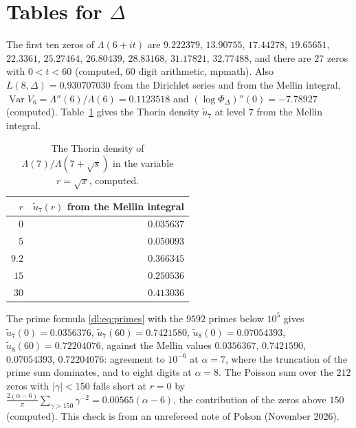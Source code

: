 \section{Tables for \texorpdfstring{$\Delta$}{Delta}}\label{dl:sec:tables}

The first ten zeros of $\Lambda(6+it)$ are $9.222379$, $13.90755$, $17.44278$, $19.65651$, $22.3361$, $25.27464$, $26.80439$, $28.83168$, $31.17821$, $32.77488$, and there are $27$ zeros with $0<t<60$ (computed, $60$ digit arithmetic, mpmath). Also $L(8,\Delta)=0.930707030$ from the Dirichlet series and from the Mellin integral, $\operatorname{Var}V_6=\Lambda''(6)/\Lambda(6)=0.1123518$ and $(\log\Phi_\Delta)''(0)=-7.78927$ (computed). Table~\ref{dl:tab:three} gives the Thorin density $\tilde u_7$ at level $7$ from the Mellin integral.

\begin{table}[htbp]
\centering\small
\begin{tabular}{rr}
\toprule
$r$ & $\tilde u_7(r)$ from the Mellin integral\\
\midrule
$0$ & $0.035637$\\
$5$ & $0.050093$\\
$9.2$ & $0.366345$\\
$15$ & $0.250536$\\
$30$ & $0.413036$\\
\bottomrule
\end{tabular}
\caption{The Thorin density of $\Lambda(7)/\Lambda(7+\sqrt s)$ in the variable $r=\sqrt x$, computed.}\label{dl:tab:three}
\end{table}

The prime formula \eqref{dl:eq:primes} with the $9592$ primes below $10^5$ gives $\tilde u_7(0)=0.0356376$, $\tilde u_7(60)=0.7421580$, $\tilde u_8(0)=0.07054393$, $\tilde u_8(60)=0.72204076$, against the Mellin values $0.0356367$, $0.7421590$, $0.07054393$, $0.72204076$: agreement to $10^{-6}$ at $\alpha=7$, where the truncation of the prime sum dominates, and to eight digits at $\alpha=8$. The Poisson sum over the $212$ zeros with $|\gamma|<150$ falls short at $r=0$ by $\frac{2(\alpha-6)}\pi\sum_{\gamma>150}\gamma^{-2}=0.00565(\alpha-6)$, the contribution of the zeros above $150$ (computed). This check is from an unrefereed note of Polson (November 2026).

